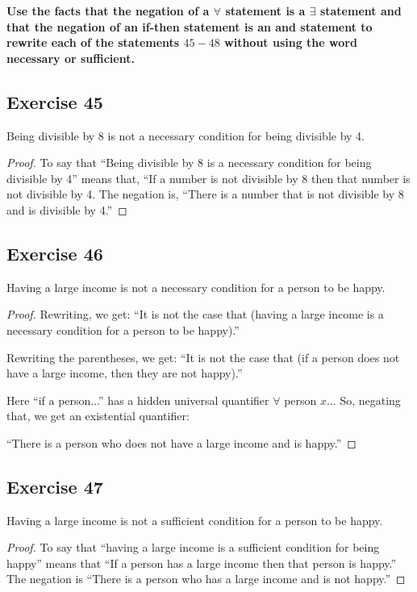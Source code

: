 \documentclass[14pt]{extarticle}
\newcommand{\fa}{\forall}
\newcommand{\te}{\exists}
\begin{document}
{\bf \color{cyan} Use the facts that the negation of a $\fa$ statement is a $\te$ statement and that the negation of an if-then statement is an and statement to rewrite each of the statements $45-48$ without using the word necessary or sufficient.}

\subsection{Exercise 45}
Being divisible by 8 is not a necessary condition for being divisible by 4.

\begin{proof}
To say that “Being divisible by 8 is a necessary condition for being divisible by 4” means that, “If a number is not divisible by 8 then that number is not divisible by 4. The negation is, “There is a number that is not divisible by 8 and is divisible by 4.”
\end{proof}

\subsection{Exercise 46}
Having a large income is not a necessary condition for a person to be happy.

\begin{proof}
Rewriting, we get: ``It is not the case that (having a large income is a necessary condition for a person to be happy).''

Rewriting the parentheses, we get: ``It is not the case that (if a person does not have a large income, then they are not happy).''

Here ``if a person...'' has a hidden universal quantifier $\fa$ person $x$... So, negating that, we get an existential quantifier:

``There is a person who does not have a large income and is happy.''
\end{proof}

\subsection{Exercise 47}
Having a large income is not a sufficient condition for a person to be happy.

\begin{proof}
To say that “having a large income is a sufficient condition for being happy” means that “If a person has a
large income then that person is happy.” The negation
is “There is a person who has a large income and is not
happy.”
\end{proof}
\end{document}
